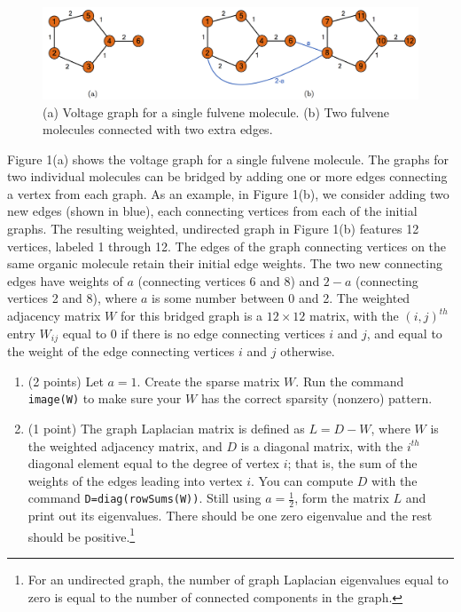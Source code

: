 \documentclass[12point]{article}
\begin{document}
\begin{enumerate}
\begin{figure}[h]
\includegraphics[width=.98\linewidth]{fig1} 
\caption{(a) Voltage graph for a single fulvene molecule. (b) Two fulvene molecules connected with two extra edges.}
\end{figure}

Figure 1(a) shows the voltage graph for a single fulvene molecule. %
The graphs for two individual molecules can be bridged by adding one or more edges  connecting a vertex from each graph. As an example, in Figure 1(b), we consider adding two new edges (shown in blue), each connecting vertices from each of the initial graphs. The resulting weighted, undirected graph in Figure 1(b) features 12 vertices, labeled 1 through 12. The edges of the graph connecting vertices on the same organic molecule retain their initial edge weights. The two new connecting edges have weights of $a$ (connecting vertices 6 and 8) and $2-a$ (connecting vertices 2 and 8), where $a$ is some number between 0 and 2. The weighted adjacency matrix $W$ for this bridged graph is a $12 \times 12$ matrix, with the $(i,j)^{th}$ entry $W_{ij}$ equal to 0 if there is no edge connecting vertices $i$ and $j$, and equal to the weight of the edge connecting vertices $i$ and $j$ otherwise.

\begin{enumerate}
\item (2 points) Let $a=1$. Create the sparse matrix $W$. Run the command \texttt{image(W)} to make sure your $W$ has the correct sparsity (nonzero) pattern.
\medskip

\item (1 point) The graph Laplacian matrix is defined as $L=D-W$, where $W$ is the weighted adjacency matrix, and $D$ is a diagonal matrix, with the $i^{th}$ diagonal element equal to the degree of vertex $i$; that is, the sum of the weights of the edges leading into vertex $i$. You can compute $D$ with the command \texttt{D=diag(rowSums(W))}. Still using $a=\frac{1}{2}$, form the matrix $L$ and print out its eigenvalues. There should be one zero eigenvalue and the rest should be positive.\footnote{For an undirected graph, the number of graph Laplacian eigenvalues equal to zero is equal to the number of connected components in the graph.} 
\medskip


\end{enumerate}
\end{enumerate}
\end{document}
